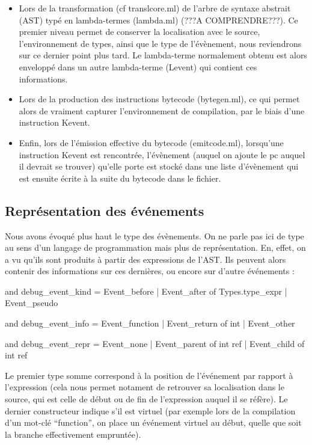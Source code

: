 \documentclass[11pt,a4paper]{report}
\begin{document}
\begin{itemize}

\item Lors de la transformation (cf translcore.ml) de l'arbre de syntaxe abstrait (AST) typé en lambda-termes (lambda.ml) (???A COMPRENDRE???). Ce premier niveau permet de conserver la localisation avec le source, l'environnement de types, ainsi que le type de l'évènement, nous reviendrons sur ce dernier point plus tard. Le lambda-terme normalement obtenu est alors enveloppé dans un autre lambda-terme (Levent) qui contient ces informations.

\item Lors de la production des instructions bytecode (bytegen.ml), ce qui permet alors de vraiment capturer l'environnement de compilation, par le biais d'une instruction Kevent.

\item Enfin, lors de l'émission effective du bytecode (emitcode.ml), lorsqu'une instruction Kevent est rencontrée, l'évènement (auquel on ajoute le pc auquel il devrait se trouver) qu'elle porte est stocké dans une liste d'évènement qui est ensuite écrite à la suite du bytecode dans le fichier.

\end{itemize}

\medskip

\subsection{Représentation des événements}

Nous avons évoqué plus haut le type des évènements. On ne parle pas ici de type au sens d'un langage de programmation mais plus de représentation. En, effet, on a vu qu'ils sont produits à partir des expressions de l'AST. Ils peuvent alors contenir des informations sur ces dernières, ou encore sur d'autre événements :

\begin{OCaml}

and debug_event_kind =
    Event_before
  | Event_after of Types.type_expr
  | Event_pseudo

and debug_event_info =
    Event_function
  | Event_return of int
  | Event_other

and debug_event_repr =
    Event_none
  | Event_parent of int ref
  | Event_child of int ref

\end{OCaml}

Le premier type somme correspond à la position de l'événement par rapport à l'expression (cela nous permet notament de retrouver sa localisation dans le source, qui est celle de début ou de fin de l'expression auquel il se réfère). Le dernier constructeur indique s'il est virtuel (par exemple lors de la compilation d'un mot-clé ``function'', on place un événement virtuel au début, quelle que soit la branche effectivement empruntée).
\end{document}
